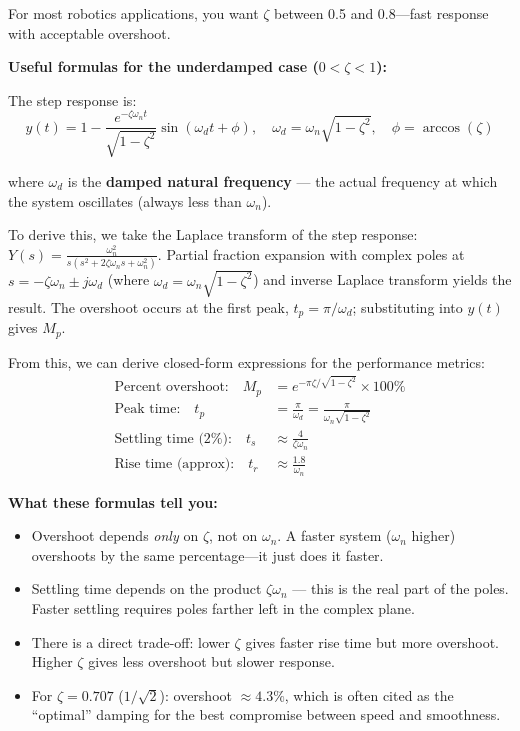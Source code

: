 For most robotics applications, you want $\zeta$ between 0.5 and 0.8---fast response with acceptable overshoot.

\textbf{Useful formulas for the underdamped case ($0 < \zeta < 1$):}

The step response is:
\begin{equation}
y(t) = 1 - \frac{e^{-\zeta\omega_n t}}{\sqrt{1 - \zeta^2}} \sin\left(\omega_d t + \phi\right), \quad \omega_d = \omega_n\sqrt{1 - \zeta^2}, \quad \phi = \arccos(\zeta)
\end{equation}

where $\omega_d$ is the \textbf{damped natural frequency} --- the actual frequency at which the system oscillates (always less than $\omega_n$).

To derive this, we take the Laplace transform of the step response: $Y(s) = \frac{\omega_n^2}{s(s^2 + 2\zeta\omega_n s + \omega_n^2)}$. Partial fraction expansion with complex poles at $s = -\zeta\omega_n \pm j\omega_d$ (where $\omega_d = \omega_n\sqrt{1-\zeta^2}$) and inverse Laplace transform yields the result. The overshoot occurs at the first peak, $t_p = \pi/\omega_d$; substituting into $y(t)$ gives $M_p$.

From this, we can derive closed-form expressions for the performance metrics:
\begin{align}
\text{Percent overshoot:} \quad M_p &= e^{-\pi\zeta / \sqrt{1-\zeta^2}} \times 100\% \\
\text{Peak time:} \quad t_p &= \frac{\pi}{\omega_d} = \frac{\pi}{\omega_n\sqrt{1-\zeta^2}} \\
\text{Settling time (2\%):} \quad t_s &\approx \frac{4}{\zeta\omega_n} \\
\text{Rise time (approx):} \quad t_r &\approx \frac{1.8}{\omega_n}
\end{align}

\textbf{What these formulas tell you:}
\begin{itemize}
    \item Overshoot depends \textit{only} on $\zeta$, not on $\omega_n$. A faster system ($\omega_n$ higher) overshoots by the same percentage---it just does it faster.
    \item Settling time depends on the product $\zeta\omega_n$ --- this is the real part of the poles. Faster settling requires poles farther left in the complex plane.
    \item There is a direct trade-off: lower $\zeta$ gives faster rise time but more overshoot. Higher $\zeta$ gives less overshoot but slower response.
    \item For $\zeta = 0.707$ ($1/\sqrt{2}$): overshoot $\approx 4.3\%$, which is often cited as the ``optimal'' damping for the best compromise between speed and smoothness.
\end{itemize}

